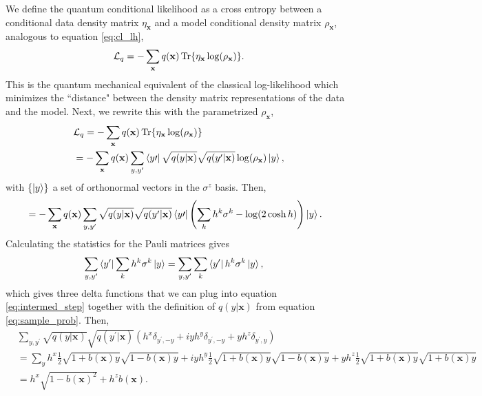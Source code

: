 We define the quantum conditional likelihood as a cross entropy between a conditional data density matrix $\eta_\mathbf{x}$ and a model conditional density matrix $\rho_\mathbf{x}$, analogous to equation \ref{eq:cl_lh},
\begin{equation}
    \mathcal{L}_{q} = -\sum_{\mathbf{x}} q(\mathbf{x}) \Tr{\eta_\mathbf{x}\log(\rho_\mathbf{x})}.
    \label{eq:q_like}
\end{equation}
This is the quantum mechanical equivalent of the classical log-likelihood which minimizes the ``distance" between the density matrix representations of the data and the model. Next, we rewrite this with the parametrized $\rho_\mathbf{x}$,
\begin{align*}
    & \mathcal{L}_{q} = -\sum_{\mathbf{x}} q(\mathbf{x}) \Tr{\eta_\mathbf{x}\log(\rho_\mathbf{x})} \\
    &= -\sum_{\mathbf{x}} q(\mathbf{x}) \sum_{y,y^\prime} \bra{y\prime}\sqrt{q(y|\mathbf{x})} \sqrt{q(y^{\prime}|\mathbf{x})}\log(\rho_\mathbf{x})\ket{y},
\end{align*}
with $\{\ket{y}\}$ a set of orthonormal vectors in the $\sigma^z$ basis. Then,
\begin{align}
    &=-\sum_{\mathbf{x}} q(\mathbf{x}) \sum_{y,y^\prime} \sqrt{q(y|\mathbf{x})} \sqrt{q(y^{\prime}|\mathbf{x})}\bra{y\prime}\left(\sum_k h^k \sigma^k - \log(2\cosh{h})\right)\ket{y}
    \label{eq:intermed_step}.
\end{align}
Calculating the statistics for the Pauli matrices gives
\begin{align*}
    \sum_{y,y^\prime}\bra{y^\prime} \sum_k h^k \sigma^k \ket{y} &= \sum_{y, y^\prime}\sum_k \bra{y^\prime}h^k \sigma^k \ket{y},
\end{align*}
which gives three delta functions that we can plug into equation \ref{eq:intermed_step} together with the definition of $q(y|\mathbf{x})$ from equation \ref{eq:sample_prob}. Then, 
\begin{align*}
    &\sum_{y, y^\prime} \sqrt{q(y|\mathbf{x})} \sqrt{q(y^{\prime}|\mathbf{x})} \left( h^x \delta_{y^\prime,-y} + i y h^y \delta_{y^\prime,-y} + y h^z \delta_{y^\prime,y} \right)\\
    &= \sum_y h^x \frac{1}{2}\sqrt{1 + b(\mathbf{x}) y} \sqrt{1 - b(\mathbf{x}) y} + i y h^y\frac{1}{2} \sqrt{1 + b(\mathbf{x}) y}\sqrt{1 - b(\mathbf{x}) y} + y h^z\frac{1}{2}\sqrt{1 + b(\mathbf{x}) y }  \sqrt{1 + b(\mathbf{x}) y} \\
    &=h^x \sqrt{1 - b(\mathbf{x})^2} + h^z b(\mathbf{x}).
\end{align*}
